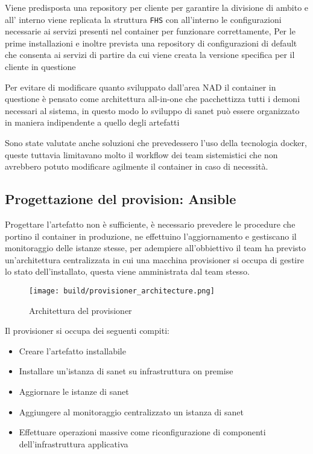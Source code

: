 Viene predisposta una repository per cliente per garantire la divisione di ambito e all' interno viene replicata la struttura \verb|FHS| con all'interno le configurazioni necessarie ai servizi presenti nel container per funzionare correttamente, Per le prime installazioni e inoltre prevista una repository di configurazioni di default che consenta ai servizi di partire da cui viene creata la versione specifica per il cliente in questione

Per evitare di modificare quanto sviluppato dall'area NAD il container in questione è pensato come architettura all-in-one che pacchettizza tutti i demoni necessari al sistema, in questo modo lo sviluppo di sanet può essere organizzato in maniera indipendente a quello degli artefatti

Sono state valutate anche soluzioni che prevedessero l'uso della tecnologia docker\cite{docker}, queste tuttavia limitavano molto il workflow dei team sistemistici che non avrebbero potuto modificare agilmente il container in caso di necessità.

\newpage
\subsection{Progettazione del provision: Ansible}

Progettare l'artefatto non è sufficiente, è necessario prevedere le procedure che portino il container in produzione, ne effettuino l'aggiornamento e gestiscano il monitoraggio delle istanze stesse, per adempiere all'obbiettivo il team ha previsto un'architettura centralizzata in cui una macchina provisioner si occupa di gestire lo stato dell'installato, questa viene amministrata dal team stesso.

\begin{figure}[H]
    \centering
    \texttt{[image: build/provisioner\_architecture.png]}
    \caption{Architettura del provisioner}
    \label{fig:provisioner_architecture}
\end{figure}

Il provisioner si occupa dei seguenti compiti:

\begin{itemize}
  \item{Creare l'artefatto installabile}
  \item{Installare un'istanza di sanet su infrastruttura on premise}
  \item{Aggiornare le istanze di sanet}
  \item{Aggiungere al monitoraggio centralizzato un istanza di sanet}
  \item{Effettuare operazioni massive come riconfigurazione di componenti dell'infrastruttura applicativa}
\end{itemize}

